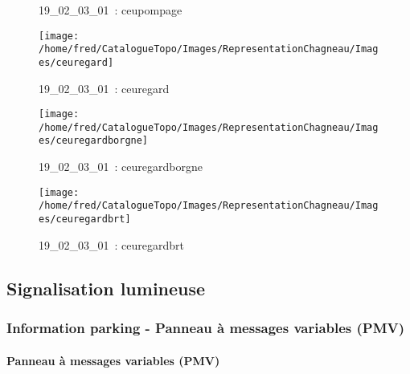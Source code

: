 \documentclass[12pt,titlepage]{book}
\begin{document}
\begin{figure}[h!]
\begin{minipage}[t]{3cm}
\begin{center}
      \caption[~19\_02\_03\_01]{\small{19\_02\_03\_01~:} \tiny{ceupompage}}\label{ceupompage}
    \end{center}
  \end{minipage}
  \begin{minipage}[t]{3cm}
    \begin{center}
      \texttt{[image: /home/fred/CatalogueTopo/Images/RepresentationChagneau/Images/ceuregard]}
      \caption[~19\_02\_03\_01]{\small{19\_02\_03\_01~:} \tiny{ceuregard}}\label{ceuregard}
    \end{center}
  \end{minipage}
  \begin{minipage}[t]{3cm}
    \begin{center}
      \texttt{[image: /home/fred/CatalogueTopo/Images/RepresentationChagneau/Images/ceuregardborgne]}
      \caption[~19\_02\_03\_01]{\small{19\_02\_03\_01~:} \tiny{ceuregardborgne}}\label{ceuregardborgne}
    \end{center}
  \end{minipage}
  \begin{minipage}[t]{3cm}
    \begin{center}
      \texttt{[image: /home/fred/CatalogueTopo/Images/RepresentationChagneau/Images/ceuregardbrt]}
      \caption[~19\_02\_03\_01]{\small{19\_02\_03\_01~:} \tiny{ceuregardbrt}}\label{ceuregardbrt}
    \end{center}
  \end{minipage}
\end{figure}
\subsection{Signalisation lumineuse}
\subsubsection{\large Information parking - Panneau à messages variables (PMV)}
\paragraph{Panneau à messages variables (PMV)}
\noindent
\vspace{\baselineskip}
\end{document}
